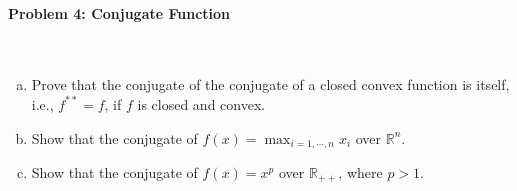 \documentclass[a4paper]{article}
\begin{document}
\paragraph{Problem 4: Conjugate Function}
~\\

\noindent
\begin{enumerate}[a)]

    \item Prove that the conjugate of the conjugate of a closed convex
          function is itself, i.e., $f^{**} = f$, if $f$ is closed and convex.
    \item Show that the conjugate of $f(x) = \max_{i=1, \cdots, n} x_i$ over $\mathbb{R}^n$.

    \item Show that the conjugate of $f(x) = x^p$ over $\mathbb{R}_{++}$, where $p > 1$.
\end{enumerate}
\end{document}
